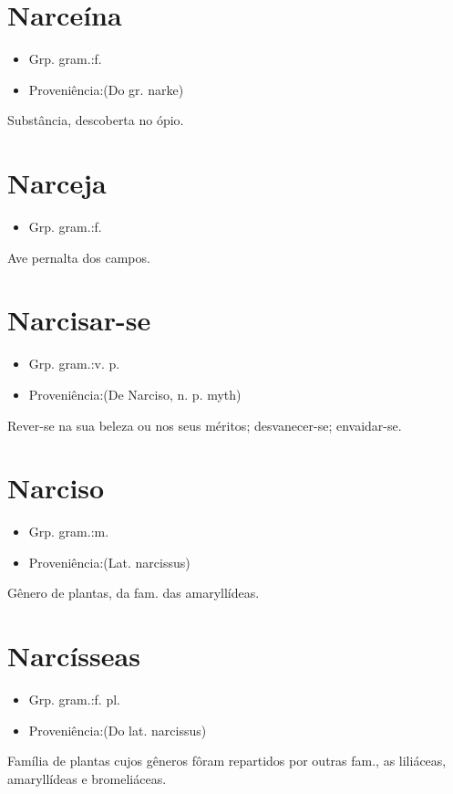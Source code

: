 \section{Narceína}
\begin{itemize}
\item {Grp. gram.:f.}
\end{itemize}
\begin{itemize}
\item {Proveniência:(Do gr. \textunderscore narke\textunderscore )}
\end{itemize}
Substância, descoberta no ópio.
\section{Narceja}
\begin{itemize}
\item {Grp. gram.:f.}
\end{itemize}
Ave pernalta dos campos.
\section{Narcisar-se}
\begin{itemize}
\item {Grp. gram.:v. p.}
\end{itemize}
\begin{itemize}
\item {Proveniência:(De \textunderscore Narciso\textunderscore , n. p. myth)}
\end{itemize}
Rever-se na sua beleza ou nos seus méritos; desvanecer-se; envaidar-se.
\section{Narciso}
\begin{itemize}
\item {Grp. gram.:m.}
\end{itemize}
\begin{itemize}
\item {Proveniência:(Lat. \textunderscore narcissus\textunderscore )}
\end{itemize}
Gênero de plantas, da fam. das amaryllídeas.
\section{Narcísseas}
\begin{itemize}
\item {Grp. gram.:f. pl.}
\end{itemize}
\begin{itemize}
\item {Proveniência:(Do lat. \textunderscore narcissus\textunderscore )}
\end{itemize}
Família de plantas cujos gêneros fôram repartidos por outras fam., as liliáceas, amaryllídeas e bromeliáceas.
